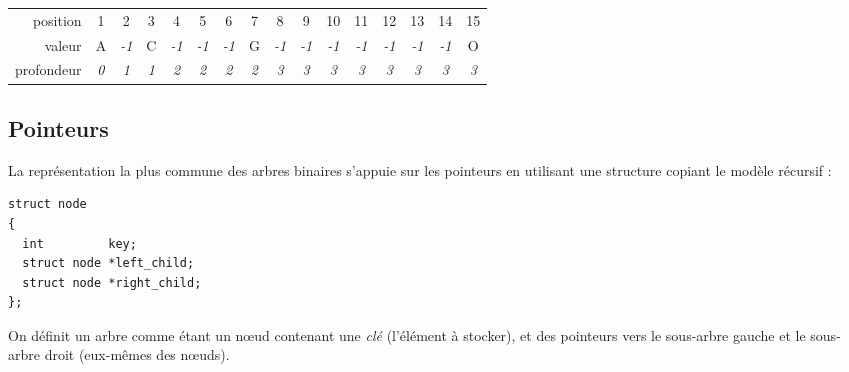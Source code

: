 \documentclass[11pt,a4paper]{article}
\begin{document}
\begin{center}
\begin{tabular}{ r c cc cccc cccccccc }
position   & 1 & 2 & 3 & 4 & 5 & 6 & 7 & 8 & 9 & 10 & 11 & 12 & 13 & 14 & 15 \\
\cline{2-16}
valeur     & \multicolumn{1}{|c|}{A} &
\multicolumn{1}{c|}{\footnotesize \textit{-1}} & \multicolumn{1}{c|}{C} &
\multicolumn{1}{c|}{\footnotesize \textit{-1}} & \multicolumn{1}{c|}{\footnotesize \textit{-1}} &
  \multicolumn{1}{c|}{\footnotesize \textit{-1}} & \multicolumn{1}{c|}{G} &
\multicolumn{1}{c|}{\footnotesize \textit{-1}} & \multicolumn{1}{c|}{\footnotesize \textit{-1}} & \multicolumn{1}{c|}{\footnotesize \textit{-1}} & \multicolumn{1}{c|}{\footnotesize \textit{-1}} &
  \multicolumn{1}{c|}{\footnotesize \textit{-1}} & \multicolumn{1}{c|}{\footnotesize \textit{-1}} & \multicolumn{1}{c|}{\footnotesize \textit{-1}} & \multicolumn{1}{c|}{O} \\
\cline{2-16}
profondeur & \textit{0} &
\textit{1} & \textit{1} &
\textit{2} & \textit{2} &
  \textit{2} & \textit{2} &
\textit{3} & \textit{3} & \textit{3} & \textit{3} &
  \textit{3} & \textit{3} & \textit{3} & \textit{3} \\
\end{tabular}
\end{center}




\pagebreak

\subsection{Pointeurs}

La représentation la plus commune des arbres binaires s'appuie sur les pointeurs en utilisant une structure copiant le modèle récursif :

\medskip

\lstset{language=C}
\begin{lstlisting}[frame=single]
struct node
{
  int         key;
  struct node *left_child;
  struct node *right_child;
};
\end{lstlisting}


On définit un arbre comme étant un nœud contenant une \textit{clé} (l'élément à stocker), et des pointeurs vers le sous-arbre gauche et le sous-arbre droit (eux-mêmes des nœuds).
\end{document}
